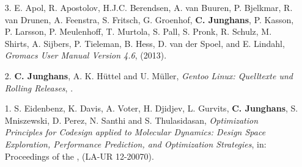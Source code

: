 \documentclass{article}
\begin{document}
\begin{enumerate}
\item[3.] E. Apol, R. Apostolov, H.J.C. Berendsen, A. van Buuren, P. Bjelkmar, R. van Drunen, A. Feenstra, S. Fritsch, G. Groenhof, \textbf{C. Junghans}, P. Kasson, P. Larsson, P. Meulenhoff, T. Murtola, S. Pall, S. Pronk, R. Schulz, M. Shirts, A. Sijbers, P. Tieleman, B. Hess, D. van der Spoel, and E. Lindahl, 
  \textit{Gromacs User Manual Version 4.6},
   (2013).

\item[2.] \textbf{C. Junghans}, A. K. H{\"u}ttel and U. M{\"u}ller, 
  \textit{Gentoo Linux: Quelltexte und Rolling Releases},
  .

\item[1.] S. Eidenbenz, K. Davis, A. Voter, H. Djidjev, L. Gurvits, \textbf{C. Junghans}, S. Mniszewski, D. Perez, N. Santhi and S. Thulasidasan,
  \textit{Optimization Principles for Codesign applied to Molecular Dynamics: Design Space Exploration, Performance Prediction, and Optimization Strategies},
  in: Proceedings of the , (LA-UR 12-20070). 

\end{enumerate}
%
\end{document}
